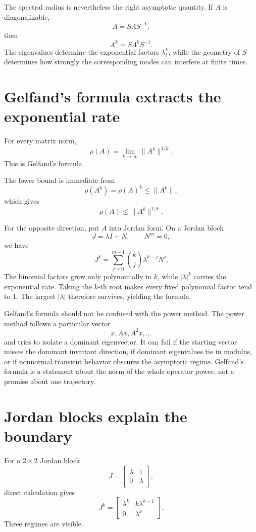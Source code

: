 The spectral radius is nevertheless the right asymptotic quantity.  If \(A\) is diagonalizable,
\[
  A=S\Lambda S^{-1},
\]
then
\[
  A^k=S\Lambda^kS^{-1}.
\]
The eigenvalues determine the exponential factors \(\lambda_i^k\), while the geometry of \(S\) determines how strongly the corresponding modes can interfere at finite times.

\section{Gelfand's formula extracts the exponential rate}

For every matrix norm,
\[
  \boxed{\rho(A)=\lim_{k\to\infty}\|A^k\|^{1/k}.}
\]
This is Gelfand's formula.

The lower bound is immediate from
\[
  \rho(A^k)=\rho(A)^k\le\|A^k\|,
\]
which gives
\[
  \rho(A)\le\|A^k\|^{1/k}.
\]

For the opposite direction, put \(A\) into Jordan form.  On a Jordan block
\[
  J=\lambda I+N,
  \qquad
  N^m=0,
\]
we have
\[
  J^k
  =\sum_{j=0}^{m-1}\binom{k}{j}\lambda^{k-j}N^j.
\]
The binomial factors grow only polynomially in \(k\), while \(|\lambda|^k\) carries the exponential rate.  Taking the \(k\)-th root makes every fixed polynomial factor tend to \(1\).  The largest \(|\lambda|\) therefore survives, yielding the formula.

Gelfand's formula should not be confused with the power method.  The power method follows a particular vector
\[
  x,Ax,A^2x,\ldots
\]
and tries to isolate a dominant eigenvector.  It can fail if the starting vector misses the dominant invariant direction, if dominant eigenvalues tie in modulus, or if nonnormal transient behavior obscures the asymptotic regime.  Gelfand's formula is a statement about the norm of the whole operator power, not a promise about one trajectory.

\section{Jordan blocks explain the boundary}

For a \(2\times2\) Jordan block
\[
  J=
  \begin{bmatrix}
    \lambda&1\\
    0&\lambda
  \end{bmatrix},
\]
direct calculation gives
\[
  J^k=
  \begin{bmatrix}
    \lambda^k&k\lambda^{k-1}\\
    0&\lambda^k
  \end{bmatrix}.
\]
Three regimes are visible.

